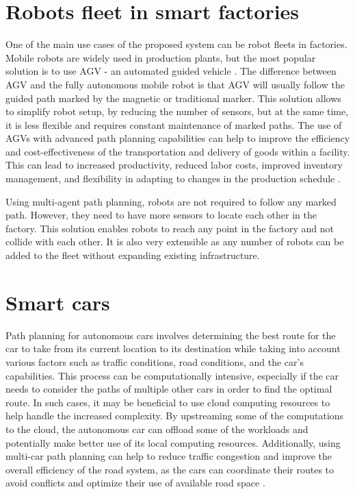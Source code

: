 \section{Robots fleet in smart factories}
One of the main use cases of the proposed system can be robot fleets in factories. Mobile robots are widely used in production plants, but the most popular solution is to use AGV - an automated guided vehicle \cite{agv}. The difference between AGV and the fully autonomous mobile robot is that AGV will usually follow the guided path marked by the magnetic or traditional marker. This solution allows to simplify robot setup, by reducing the number of sensors, but at the same time, it is less flexible and requires constant maintenance of marked paths. The use of AGVs with advanced path planning capabilities can help to improve the efficiency and cost-effectiveness of the transportation and delivery of goods within a facility. This can lead to increased productivity, reduced labor costs, improved inventory management, and flexibility in adapting to changes in the production schedule 
 \cite{a_star_factories}.

Using multi-agent path planning, robots are not required to follow any marked path. However, they need to have more sensors to locate each other in the factory. This solution enables robots to reach any point in the factory and not collide with each other. It is also very extensible as any number of robots can be added to the fleet without expanding existing infrastructure.

\section{Smart cars}

Path planning for autonomous cars involves determining the best route for the car to take from its current location to its destination while taking into account various factors such as traffic conditions, road conditions, and the car's capabilities. This process can be computationally intensive, especially if the car needs to consider the paths of multiple other cars in order to find the optimal route. In such cases, it may be beneficial to use cloud computing resources to help handle the increased complexity. By upstreaming some of the computations to the cloud, the autonomous car can offload some of the workloads and potentially make better use of its local computing resources. Additionally, using multi-car path planning can help to reduce traffic congestion and improve the overall efficiency of the road system, as the cars can coordinate their routes to avoid conflicts and optimize their use of available road space \cite{smart_cars}.
